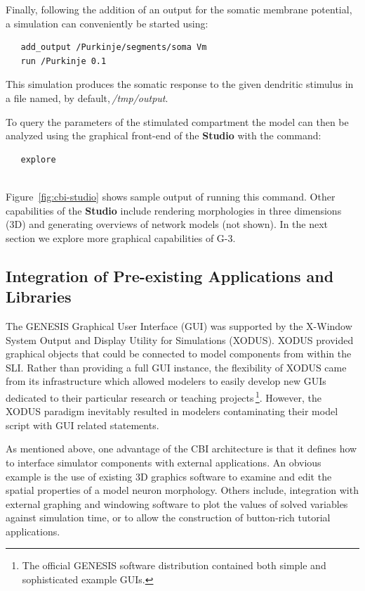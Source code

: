 \documentclass[10pt]{article}
\begin{document}
Finally, following the addition of an output for the somatic membrane potential, a simulation can conveniently be started using:
\begin{verbatim}
   add_output /Purkinje/segments/soma Vm
   run /Purkinje 0.1
\end{verbatim}
This simulation produces the somatic response to the given dendritic stimulus in a file named, by default,\,{\it /tmp/output}.

To query the parameters of the stimulated compartment the model can
then be analyzed using the graphical front-end of the {\bf Studio}
with the command:

\begin{verbatim}
   explore
\end{verbatim}

\\

Figure~\ref{fig:cbi-studio} shows sample output of running this
command.  Other capabilities of the {\bf Studio} include rendering
morphologies in three dimensions (3D) and generating overviews of network
models (not shown).  In the next section we explore more graphical
capabilities of G-3.

\subsection*{Integration of Pre-existing Applications and Libraries}

The GENESIS Graphical User Interface (GUI) was supported by the
X-Window System Output and Display Utility for Simulations (XODUS).
XODUS provided graphical objects that could be
connected to model components from within the SLI.  Rather than
providing a full GUI instance, the flexibility of XODUS came from its
infrastructure which allowed modelers to easily develop new GUIs
dedicated to their particular research or teaching projects\,\footnote{The
  official GENESIS software distribution contained both simple and
  sophisticated example GUIs.}.  However, the XODUS paradigm
inevitably resulted in modelers contaminating their model script with GUI
related statements.

As mentioned above, one advantage of the CBI architecture is that it defines how to interface simulator components
with external applications.  An obvious example is the use of existing
3D graphics software to examine and edit the spatial properties of a
model neuron morphology.  Others include, integration with external
graphing and windowing software to plot the values of solved
variables against simulation time, or to allow the construction of
button-rich tutorial applications.
\end{document}
